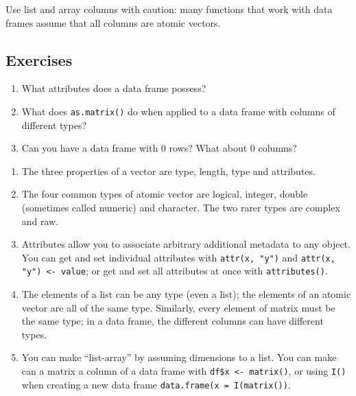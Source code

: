 Use list and array columns with caution: many functions that work with
data frames assume that all columns are atomic vectors.

\subsection{Exercises}\label{exercises-3}

\begin{enumerate}
\def\labelenumi{\arabic{enumi}.}
\item
  What attributes does a data frame possess?
\item
  What does \texttt{as.matrix()} do when applied to a data frame with
  columns of different types?
\item
  Can you have a data frame with 0 rows? What about 0 columns?
\end{enumerate}


\begin{enumerate}
\def\labelenumi{\arabic{enumi}.}
\item
  The three properties of a vector are type, length, type and
  attributes.
\item
  The four common types of atomic vector are logical, integer, double
  (sometimes called numeric) and character. The two rarer types are
  complex and raw.
\item
  Attributes allow you to associate arbitrary additional metadata to any
  object. You can get and set individual attributes with
  \texttt{attr(x, "y")} and \texttt{attr(x, "y") \textless{}- value}; or
  get and set all attributes at once with \texttt{attributes()}.
\item
  The elements of a list can be any type (even a list); the elements of
  an atomic vector are all of the same type. Similarly, every element of
  matrix must be the same type; in a data frame, the different columns
  can have different types.
\item
  You can make ``list-array'' by assuming dimensions to a list. You can
  make can a matrix a column of a data frame with
  \texttt{df\$x \textless{}- matrix()}, or using \texttt{I()} when
  creating a new data frame \texttt{data.frame(x = I(matrix())}.
\end{enumerate}
